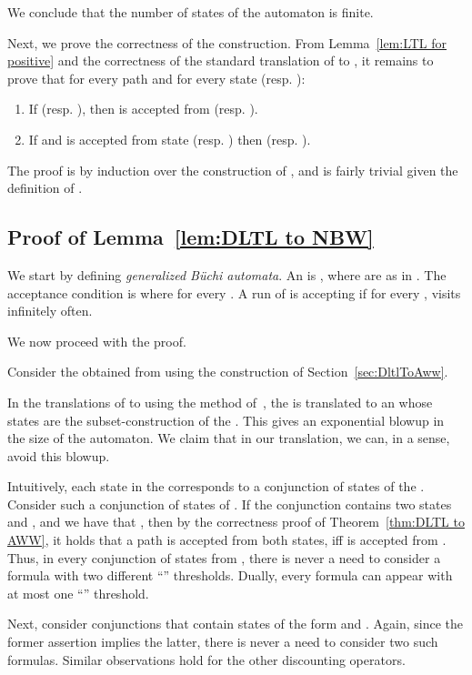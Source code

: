 \documentclass{llncs}
\begin{document}
We conclude that the number of states of the automaton is finite.

Next, we prove the correctness of the construction. From Lemma~\ref{lem:LTL for positive} and the correctness of the standard translation of  to , it remains to prove that for every path  and for every state  (resp. ):
\begin{enumerate}
\item If  (resp. ), then  is accepted from  (resp. ).
\item If  and  is accepted from state  (resp. ) then  (resp. ).
\end{enumerate} 

The proof is by induction over the construction of , and is fairly trivial given the definition of .




\subsection{Proof of Lemma~\ref{lem:DLTL to NBW}}
We start by defining {\em generalized B\"uchi automata}. An  is , where  are as in . The acceptance condition is  where  for every . A run  of  is accepting if for every ,  visits  infinitely often.

We now proceed with the proof.

Consider the   obtained from  using the construction of Section~\ref{sec:DltlToAww}.

In the translations of  to  using the method of~\cite{GO01}, the  is translated to an  whose states are the subset-construction of the .
This gives an exponential blowup in the size of the automaton. We claim that in our translation, we can, in a sense, avoid this blowup.

Intuitively, each state in the  corresponds to a conjunction of states of the . Consider such a conjunction of states of . If the conjunction contains two states  and , and we have that , then by the correctness proof of Theorem~\ref{thm:DLTL to AWW}, it holds that a path  is accepted from both states, iff  is accepted from . Thus, in every conjunction of states from , there is never a need to consider a formula with two different ``'' thresholds. Dually, every formula can appear with at most one ``'' threshold.

Next, consider conjunctions that contain states of the form  and . Again, since the former assertion implies the latter, there is never a need to consider two such formulas. Similar observations hold for the other discounting operators.
\end{document}

